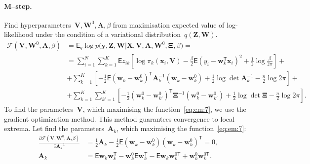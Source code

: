 \documentclass[12pt, twoside]{article}
\begin{document}
\paragraph{M--step.} 
Find hyperparameters~$\mathbf{V}, \mathbf{W}^0, \textbf{A},  \beta$ from maximisation expected value of log-likelihood under the condition of a variational distribution~$q\left(\mathbf{Z}, \mathbf{W}\right)$.
\[
\label{eq:em:7}
\begin{aligned}
\mathcal{F}\left(\textbf{V}, \textbf{W}^{0}, \textbf{A}, \beta\right) &= \mathsf{E}_{q}\log p\bigr(\mathbf{y}, \mathbf{Z}, \mathbf{W}|\mathbf{X}, \mathbf{V}, \textbf{A}, \textbf{W}^{0}, \bm{\Xi}, \beta\bigr) =  \\
&= \sum_{i=1}^{N}\sum_{k=1}^{K}\mathsf{E}z_{ik}\left[\log\pi_k\left(\textbf{x}_i, \textbf{V}\right) - \frac{\beta}{2}\mathsf{E}\left(y_{i} - \textbf{w}_{k}^{\mathsf{T}}\textbf{x}_{i}\right)^{2} + \frac{1}{2}\log\frac{\beta}{2\pi}\right] +\\
&+ \sum_{k=1}^{K}\left[-\frac{1}{2}\mathsf{E}\left(\textbf{w}_{k} - \textbf{w}_{k}^{0}\right)^{\mathsf{T}}\textbf{A}_{k}^{-1}\left(\textbf{w}_{k} - \textbf{w}_{k}^{0}\right) + \frac{1}{2}\log\det\textbf{A}^{-1}_{k} - \frac{n}{2}\log2\pi\right] +\\
&+ \sum_{k=1}^{K}\sum_{k'=1}^{K}\left[-\frac{1}{2}\left(\textbf{w}_{k}^{0}-\textbf{w}_{k'}^{0}\right)^{\mathsf{T}}\bm{\Xi}^{-1}\left(\textbf{w}_{k}^{0}-\textbf{w}_{k'}^{0}\right) +\frac{1}{2}\log\det\bm{\Xi} -\frac{n}{2}\log{2\pi}\right].
\end{aligned}
\]
To find the parameters~$\textbf{V}$, which maximising the function~\eqref{eq:em:7}, we use the gradient optimization method.
This method guarantees convergence to local extrema.
Let find the parameters~$\textbf{A}_k$, which maximising the function~\eqref{eq:em:7}:
\[
\label{eq:em:9}
\begin{aligned}
\frac{\partial \mathcal{F}\left(\textbf{V}, \textbf{W}^{0}, \textbf{A}, \beta\right)}{\partial \textbf{A}^{-1}_k} &=  \frac{1}{2}\textbf{A}_{k} - \frac{1}{2}\mathsf{E}\left(\textbf{w}_{k} - \textbf{w}_{k}^{0}\right)\left(\textbf{w}_{k} - \textbf{w}_{k}^{0}\right)^{\mathsf{T}} = 0,\\
\textbf{A}_{k} &= \mathsf{E}\textbf{w}_{k}\textbf{w}_{k}^{\mathsf{T}} - \textbf{w}_{k}^{0}\mathsf{E}\textbf{w}_{k}^{\mathsf{T}} - \mathsf{E}\textbf{w}_{k}\textbf{w}_{k}^{0\mathsf{T}} + \textbf{w}_{k}^{0}\textbf{w}_{k}^{0\mathsf{T}}.
\end{aligned}
\]
\end{document}
